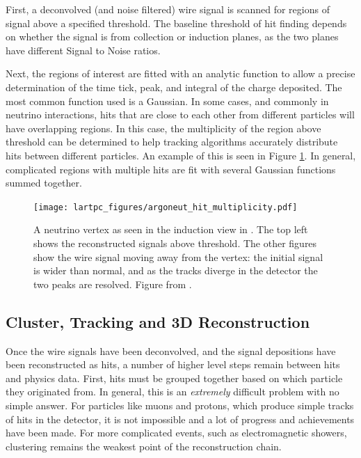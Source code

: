 First, a deconvolved (and noise filtered) wire signal is scanned for regions of signal above a specified threshold.  The baseline threshold of hit finding depends on whether the signal is from collection or induction planes, as the two planes have different Signal to Noise ratios.

Next, the regions of interest are fitted with an analytic function to allow a precise determination of the time tick, peak, and integral of the charge deposited.  The most common function used is a Gaussian.  In some cases, and commonly in neutrino interactions, hits that are close to each other from different particles will have overlapping regions.  In this case, the multiplicity of the region above threshold can be determined to help tracking algorithms accurately distribute hits between different particles.  An example of this is seen in Figure \ref{fig:argoneut_hit_multiplicity}.  In general, complicated regions with multiple hits are fit with several Gaussian functions summed together.

\begin{figure}[htbp]
  \centering
  \texttt{[image: lartpc\_figures/argoneut\_hit\_multiplicity.pdf]}
  \caption[Hit Finding in \argoneut]{A neutrino vertex as seen in the induction view in \argoneut.  The top left shows the reconstructed signals above threshold.  The other figures show the wire signal moving away from the vertex: the initial signal is wider than normal, and as the tracks diverge in the detector the two peaks are resolved.  Figure from \cite{Anderson:2012vc}.}
  \label{fig:argoneut_hit_multiplicity}
\end{figure}

\subsection{Cluster, Tracking and 3D Reconstruction}

Once the wire signals have been deconvolved, and the signal depositions have been reconstructed as hits, a number of higher level steps remain between hits and physics data.  First, hits must be grouped together based on which particle they originated from.  In general, this is an {\em extremely} difficult problem with no simple answer.  For particles like muons and protons, which produce simple tracks of hits in the detector, it is not impossible and a lot of progress and achievements have been made.  For more complicated events, such as electromagnetic showers, clustering remains the weakest point of the reconstruction chain.

